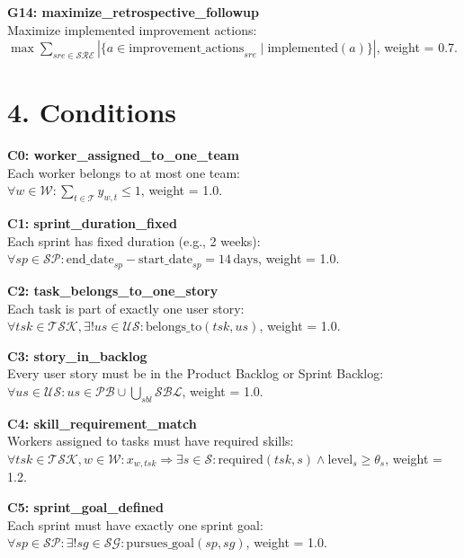 \documentclass[12pt]{article}
\begin{document}
    \item \textbf{G14: maximize\_retrospective\_followup} \\
    Maximize implemented improvement actions: \\
    $\max \sum_{sre \in \mathcal{SRE}} \left| \{ a \in \text{improvement\_actions}_{sre} \mid \text{implemented}(a) \} \right|$, weight = 0.7.

\section{4. Conditions}

\item \textbf{C0: worker_assigned_to_one_team} \\
    Each worker belongs to at most one team: \\
    $\forall w \in \mathcal{W}: \sum_{t \in \mathcal{T}} y_{w,t} \leq 1$, weight = 1.0.

    \item \textbf{C1: sprint_duration_fixed} \\
    Each sprint has fixed duration (e.g., 2 weeks): \\
    $\forall sp \in \mathcal{SP}: \text{end\_date}_{sp} - \text{start\_date}_{sp} = 14\,\text{days}$, weight = 1.0.

    \item \textbf{C2: task_belongs_to_one_story} \\
    Each task is part of exactly one user story: \\
    $\forall tsk \in \mathcal{TSK}, \exists! us \in \mathcal{US}: \text{belongs\_to}(tsk, us)$, weight = 1.0.

    \item \textbf{C3: story_in_backlog} \\
    Every user story must be in the Product Backlog or Sprint Backlog: \\
    $\forall us \in \mathcal{US}: us \in \mathcal{PB} \cup \bigcup_{sbl} \mathcal{SBL}$, weight = 1.0.

    \item \textbf{C4: skill_requirement_match} \\
    Workers assigned to tasks must have required skills: \\
    $\forall tsk \in \mathcal{TSK}, w \in \mathcal{W}: x_{w,tsk} \Rightarrow \exists s \in \mathcal{S}: \text{required}(tsk,s) \land \text{level}_s \geq \theta_s$, weight = 1.2.

    \item \textbf{C5: sprint_goal_defined} \\
    Each sprint must have exactly one sprint goal: \\
    $\forall sp \in \mathcal{SP}: \exists! sg \in \mathcal{SG}: \text{pursues\_goal}(sp, sg)$, weight = 1.0.
\end{document}
